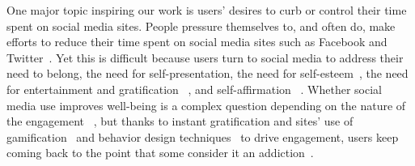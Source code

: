 One major topic inspiring our work is users' desires to curb or control their time spent on social media sites. People pressure themselves to, and often do, make efforts to reduce their time spent on social media sites such as Facebook and Twitter~\cite{Sleeper:2015:ILI:2675133.2675193,schoenebeck2014giving}. Yet this is difficult because users turn to social media to address their need to belong, the need for self-presentation, the need for self-esteem~\cite{nadkarni2012people}, the need for entertainment and gratification ~\cite{raacke2008myspace}, and self-affirmation ~\cite{toma2013self}. Whether social media use improves well-being is a complex question depending on the nature of the engagement ~\cite{uysal2013mediating, marche2012facebook, lin2015emotional, kim2011facebook, muise2009more, sagioglou2014facebook, tandoc2015facebook}, but thanks to instant gratification and sites' use of gamification~\cite{chou2015actionable, zichermann2011gamification, huotari2012defining} and behavior design techniques~\cite{fogg2002persuasive, eyal2014hooked} to drive engagement, users keep coming back to the point that some consider it an addiction~\cite{andreassen2012development, ryan2014uses, tang2016personality, turel2014examination}. %





